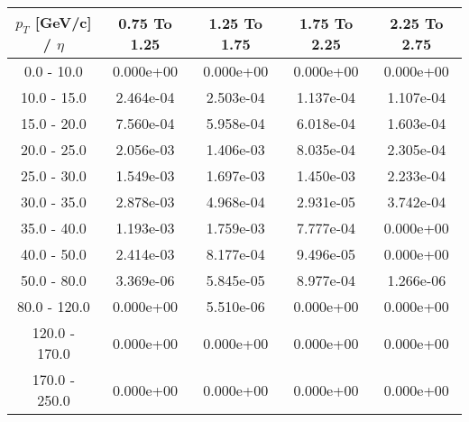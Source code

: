 \begin{tabular}{|c|c|c|c|c|}\hline 
$p_T$ [GeV/c] / $\eta$  & 0.75 To 1.25 & 1.25 To 1.75 & 1.75 To 2.25 & 2.25 To 2.75 \\ 
 \hline 
0.0 - 10.0 & 0.000e+00 & 0.000e+00 & 0.000e+00 & 0.000e+00 \\ 
10.0 - 15.0 & 2.464e-04 & 2.503e-04 & 1.137e-04 & 1.107e-04 \\ 
15.0 - 20.0 & 7.560e-04 & 5.958e-04 & 6.018e-04 & 1.603e-04 \\ 
20.0 - 25.0 & 2.056e-03 & 1.406e-03 & 8.035e-04 & 2.305e-04 \\ 
25.0 - 30.0 & 1.549e-03 & 1.697e-03 & 1.450e-03 & 2.233e-04 \\ 
30.0 - 35.0 & 2.878e-03 & 4.968e-04 & 2.931e-05 & 3.742e-04 \\ 
35.0 - 40.0 & 1.193e-03 & 1.759e-03 & 7.777e-04 & 0.000e+00 \\ 
40.0 - 50.0 & 2.414e-03 & 8.177e-04 & 9.496e-05 & 0.000e+00 \\ 
50.0 - 80.0 & 3.369e-06 & 5.845e-05 & 8.977e-04 & 1.266e-06 \\ 
80.0 - 120.0 & 0.000e+00 & 5.510e-06 & 0.000e+00 & 0.000e+00 \\ 
120.0 - 170.0 & 0.000e+00 & 0.000e+00 & 0.000e+00 & 0.000e+00 \\ 
170.0 - 250.0 & 0.000e+00 & 0.000e+00 & 0.000e+00 & 0.000e+00 \\ 
 \hline 
\end{tabular} 
